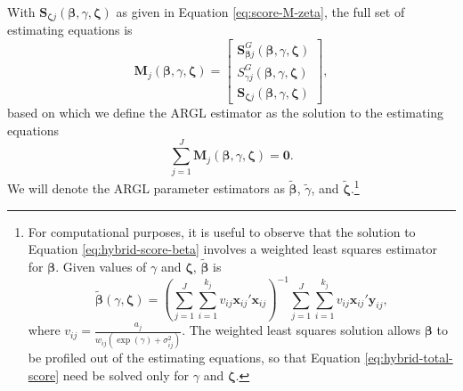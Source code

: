 \documentclass[
  american,
  man, donotrepeattitle,floatsintext]{apa7}
\begin{document}
With \(\mathbf{S}_{\boldsymbol\zeta j}\left(\boldsymbol{\beta}, \gamma, \boldsymbol{\zeta}\right)\) as given in Equation \eqref{eq:score-M-zeta}, the full set of estimating equations is
\begin{equation}
\label{eq:hybrid-score}
\mathbf{M}_j(\boldsymbol\beta, \gamma, \boldsymbol\zeta) = \left[\begin{array}{c} \mathbf{S}^G_{\boldsymbol\beta j}(\boldsymbol\beta, \gamma, \boldsymbol\zeta) \\ S^G_{\gamma j}(\boldsymbol\beta, \gamma, \boldsymbol\zeta) \\ \mathbf{S}_{\boldsymbol\zeta j}(\boldsymbol\beta, \gamma, \boldsymbol\zeta) \end{array}\right],
\end{equation}
based on which we define the ARGL estimator as the solution to the estimating equations
\begin{equation}
\label{eq:hybrid-total-score}
\sum_{j=1}^J \mathbf{M}_j(\boldsymbol\beta, \gamma, \boldsymbol\zeta) = \mathbf{0}.
\end{equation}
We will denote the ARGL parameter estimators as \(\boldsymbol{\tilde\beta}\), \(\tilde\gamma\), and \(\boldsymbol{\tilde\zeta}\).\footnote{For computational purposes, it is useful to observe that the solution to Equation \eqref{eq:hybrid-score-beta} involves a weighted least squares estimator for \(\boldsymbol\beta\). Given values of \(\gamma\) and \(\boldsymbol\zeta\), \(\boldsymbol{\tilde\beta}\) is
  \[
  \boldsymbol{\tilde\beta}(\gamma, \boldsymbol\zeta) = \left(\sum_{j=1}^J \sum_{i=1}^{k_j} v_{ij} \mathbf{x}_{ij}' \mathbf{x}_{ij}\right)^{-1} \sum_{j=1}^J \sum_{i=1}^{k_j} v_{ij} \mathbf{x}_{ij}' \mathbf{y}_{ij},
  \]
  where \(v_{ij} = \frac{a_j}{w_{ij} \left(\exp(\gamma) + \sigma_{ij}^2\right)}\).
  The weighted least squares solution allows \(\boldsymbol\beta\) to be profiled out of the estimating equations, so that Equation \eqref{eq:hybrid-total-score} need be solved only for \(\gamma\) and \(\boldsymbol\zeta\).}
\end{document}
